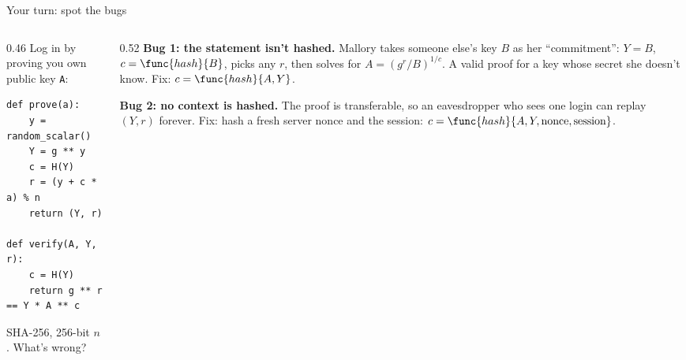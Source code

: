\ifdefined\PRESENTATION\else\PassOptionsToClass{handout}{beamer}\fi\documentclass[aspectratio=169, lualatex]{beamer}
\begin{document}
\begin{frame}[fragile]{Your turn: spot the bugs}
	\begin{columns}[T]
		\begin{column}{0.46\textwidth}
			Log in by proving you own public key \texttt{A}:
			{\small
				\begin{verbatim}
def prove(a):
    y = random_scalar()
    Y = g ** y
    c = H(Y)
    r = (y + c * a) % n
    return (Y, r)

def verify(A, Y, r):
    c = H(Y)
    return g ** r == Y * A ** c
\end{verbatim}
			}
			SHA-256, 256-bit $n$. What's wrong?
		\end{column}
		\begin{column}{0.52\textwidth}
			\pause
			\textbf{Bug 1: the statement isn't hashed.} Mallory takes someone else's key $B$ as her ``commitment'': $Y = B$, $c = \func{hash}{B}$, picks any $r$, then solves for $A = (g^r / B)^{1/c}$. A valid proof for a key whose secret she doesn't know. Fix: $c = \func{hash}{A, Y}$.
			\pause
			\vspace{0.2cm}

			\textbf{Bug 2: no context is hashed.} The proof is transferable, so an eavesdropper who sees one login can replay $(Y, r)$ forever. Fix: hash a fresh server nonce and the session: $c = \func{hash}{A, Y, \text{nonce}, \text{session}}$.
		\end{column}
	\end{columns}
\end{frame}
\end{document}
